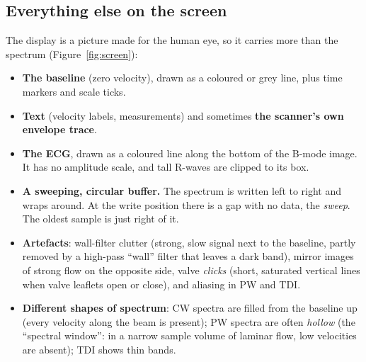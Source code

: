 \documentclass[11pt,a4paper]{article}
\begin{document}
\subsection{Everything else on the screen}
The display is a picture made for the human eye, so it carries more than the spectrum (Figure~\ref{fig:screen}):
\begin{itemize}
\item \textbf{The baseline} (zero velocity), drawn as a coloured or grey line, plus time markers and scale ticks.
\item \textbf{Text} (velocity labels, measurements) and sometimes \textbf{the scanner's own envelope trace}.
\item \textbf{The ECG}, drawn as a coloured line along the bottom of the B-mode image. It has no amplitude scale, and
tall R-waves are clipped to its box.
\item \textbf{A sweeping, circular buffer.} The spectrum is written left to right and wraps around. At the write
position there is a gap with no data, the \emph{sweep}. The oldest sample is just right of it.
\item \textbf{Artefacts}: wall-filter clutter (strong, slow signal next to the baseline, partly removed by a
high-pass ``wall'' filter that leaves a dark band), mirror images of strong flow on the opposite side, valve
\emph{clicks} (short, saturated vertical lines when valve leaflets open or close), and aliasing in PW and TDI.
\item \textbf{Different shapes of spectrum}: CW spectra are filled from the baseline up (every velocity along the beam
is present); PW spectra are often \emph{hollow} (the ``spectral window'': in a narrow sample volume of laminar flow,
low velocities are absent); TDI shows thin bands.
\end{itemize}
\end{document}
